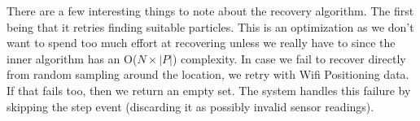 \documentclass[10pt,journal,letterpaper,compsoc]{IEEEtran}
\begin{document}

There are a few interesting things to note about the recovery algorithm.
The first being that it retries finding suitable particles. This is an 
optimization as we don't want to spend too much effort at recovering 
unless we really have to since the inner algorithm has an O($N \times |P|$) 
complexity. In case we fail to recover directly from random sampling 
around the location, we retry with Wifi Positioning data. If that fails 
too, then we return an empty set. The system handles this failure by skipping 
the step event (discarding it as possibly invalid sensor readings).
\end{document}
